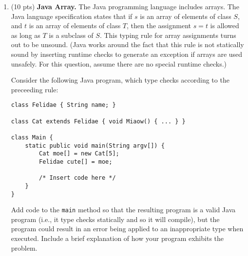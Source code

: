 \documentclass[10pt]{article}
\newcommand{\infertext}[2]{\infer{{\textrm{#1}}}{#2}}
\begin{document}
\begin{enumerate}
          \begin{center}
              $O$[Int/x] $\vdash$ \tt{x $<$- (let x:Object $<$- x in x = x): Int}
          \end{center}
          \textcolor{blue}{
              \begin{equation}
                  \infertext
                  {$O$[I/x] $\vdash$ x $<$- (let x:Ob $<$- x in x = x): I}
                  {\textrm{\infertext{$O$[I/x] $\vdash$ x: I}
                  {\textrm{$O$[I/x](x) = I}}
                  \ \ {\textrm{Bool $\leq$ I}}
                  \ \ \infertext{O[I/x] $\vdash$ let x:Ob $<$- x in x = x: Bool}
                  {
                  {\infertext{$O$[I/x] $\vdash$ x: I}
                          {\textrm{$O$[I/x](x) = I}}
                      }
                      {\ \ \ \textrm{I $<$= Ob}}
                  \ \ {\infertext{$O$[I/x][Ob/x] $\vdash$ x = x: Bool}
                  {\infertext{$O$[I/x][Ob/x] $\vdash$ x: Ob}
                      {\textrm{$O$[I/x][Ob/x](x) = Ob}}
                      \ \ \infertext{$O$[I/x][Ob/x] $\vdash$ x: Ob}{\textrm{$O$[I/x][Ob/x](x) = Ob}}}}}}}
              \end{equation}
          }
          \medskip
    \item (10 pts) \textbf{Java Array.} The Java programming language includes arrays.  The Java
          language specification states that if $s$ is an array of elements of
          class $S$, and $t$ is an array of elements of class $T$, then the
          assignment $s = t$ is allowed as long as $T$ is a subclass of $S$.
          This typing rule for array assignments turns out to be unsound. (Java
          works around the fact that this rule is not statically sound by inserting
          runtime checks to generate an exception if arrays are used
          unsafely. For this question, assume there are no special runtime checks.)

          Consider the following Java program, which type checks according
          to the preceeding rule:
          \begin{verbatim}
class Felidae { String name; }

class Cat extends Felidae { void Miaow() { ... } }

class Main {
    static public void main(String argv[]) {
        Cat moe[] = new Cat[5];
        Felidae cute[] = moe;

        /* Insert code here */
    }
}
\end{verbatim}
          Add code to the \texttt{main} method so that the resulting program is
          a valid Java program (i.e., it type checks statically and so it will
          compile), but the program could result in an error being applied
          to an inappropriate type when executed.  Include a brief explanation
          of how your program exhibits the problem.


\end{enumerate}
\end{document}
